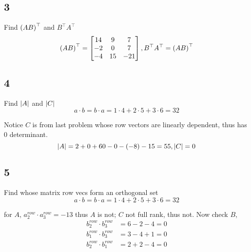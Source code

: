 \documentclass{article}
\begin{document}
\subsection*{3}
\begin{myleftlinebox}
    Find \(\left( AB \right)^\top\) and \(B^\top A^\top\)
    \tcblower
    \[
        \left( AB \right)^\top = \begin{bmatrix}
            14 & 9 & 7\\
            -2 & 0 & 7\\
            -4 & 15 & -21
        \end{bmatrix}, B^\top A^\top = \left( AB \right)^\top
    \]
\end{myleftlinebox}


\subsection*{4}
\begin{myleftlinebox}
    Find \(\left\vert A\right\vert\) and \(\left\vert C\right\vert\)
    \tcblower
    \[
        a\cdot b = b\cdot a = 1\cdot 4+2\cdot 5+3\cdot 6 = 32
    \]
\end{myleftlinebox}
Notice \(C\) is from last problem whose row vectors are linearly dependent, thus has \(0\) determinant.
\[
    \left\vert A\right\vert=2+0+60-0-(-8)-15 = 55, \left\vert C\right\vert=0
\]

\subsection*{5}
\begin{myleftlinebox}
    Find whose matrix row vecs form an orthogonal set
    \tcblower
    \[
        a\cdot b = b\cdot a = 1\cdot 4+2\cdot 5+3\cdot 6 = 32
    \]
\end{myleftlinebox}

for \(A\), \(a^{row}_2\cdot a^{row}_3 = -13\) thus \(A\) is not; \(C\) not full rank, thus not. Now check \(B\), 
\begin{align*}
    b^{row}_2\cdot b^{row}_3 & = 6-2-4=0\\
    b^{row}_1\cdot b^{row}_3 & =3-4+1=0\\
    b^{row}_2\cdot b^{row}_1 & =2+2-4=0
\end{align*}
\end{document}
